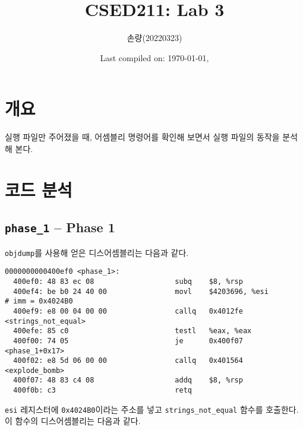 \documentclass{scrartcl}
\title{CSED211: Lab 3}
\author{손량(20220323)}
\date{Last compiled on: \today, \currenttime}
\begin{document}
\maketitle

\section{개요}
실행 파일만 주어졌을 때, 어셈블리 명령어를 확인해 보면서 실행 파일의 동작을
분석해 본다.

\section{코드 분석}
\subsection{\texttt{phase\_1} -- Phase 1}
\texttt{objdump}를 사용해 얻은 디스어셈블리는 다음과 같다.
\begin{lstlisting}
0000000000400ef0 <phase_1>:
  400ef0: 48 83 ec 08                   subq    $8, %rsp
  400ef4: be b0 24 40 00                movl    $4203696, %esi          # imm = 0x4024B0
  400ef9: e8 00 04 00 00                callq   0x4012fe <strings_not_equal>
  400efe: 85 c0                         testl   %eax, %eax
  400f00: 74 05                         je      0x400f07 <phase_1+0x17>
  400f02: e8 5d 06 00 00                callq   0x401564 <explode_bomb>
  400f07: 48 83 c4 08                   addq    $8, %rsp
  400f0b: c3                            retq
\end{lstlisting}
\texttt{esi} 레지스터에 \texttt{0x4024B0}이라는 주소를 넣고
\texttt{strings\_not\_equal} 함수를 호출한다. 이 함수의 디스어셈블리는 다음과
같다.
\end{document}
